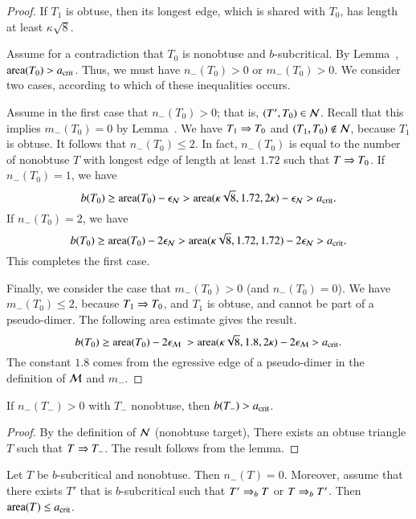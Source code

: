\begin{proof} 
  If $T_1$ is obtuse, then its longest edge, which is shared with
  $T_0$, has length at least $\kappa\sqrt8$.

  Assume for a contradiction that $T_0$ is nonobtuse and
  $b$-subcritical.  By Lemma~, ${\operatorname{area}}(T_0) > a_\text{crit}$.
  Thus, we must have $n_-(T_0)>0$ or $m_-(T_0)>0$.  We consider two
  cases, according to which of these inequalities occurs.

  Assume in the first case that $n_-(T_0)>0$; that is, $(T',T_0)\in
  \mathcal N$.  Recall that this implies $m_-(T_0)=0$ by
  Lemma~.  We have $T_1\Rightarrow T_0$ and $(T_1,T_0)\not\in
  \mathcal N$, because $T_1$ is obtuse.  It follows that $n_-(T_0)\le 2$.  In
  fact, $n_-(T_0)$ is equal to the number of nonobtuse $T$ with
  longest edge of length at least $1.72$ such that $T\Rightarrow T_0$.  If
  $n_-(T_0)=1$, we have
  \[
b(T_0) \ge {\operatorname{area}}(T_0) - \epsilon_{\mathcal N} 
> {\operatorname{area}}(\kappa\sqrt8,1.72,2\kappa)  - \epsilon_{\mathcal N} > a_\text{crit}.
\]
If $n_-(T_0)=2$, we have
  \[
b(T_0) \ge {\operatorname{area}}(T_0) - 2\epsilon_{\mathcal N} 
> {\operatorname{area}}(\kappa\sqrt8,1.72,1.72)  - 2\epsilon_{\mathcal N} > a_\text{crit}.
\]
  This completes the first case.

  Finally, we consider the case that $m_-(T_0)>0$ (and $n_-(T_0)=0$).
  We have $m_-(T_0)\le 2$, because $T_1\Rightarrow T_0$, and $T_1$ is obtuse,
  and cannot be part of a pseudo-dimer.  The following area estimate
  gives the result.
\[
  b(T_0) \ge \area(T_0) - 2\epsM\ 
  > \area(\kappa\sqrt8,1.8,2\kappa) -
  2\epsM > \acrit.
\]
The constant $1.8$ comes from the egressive edge of a pseudo-dimer in
the definition of $\mathcal M$ and $m_-$.
\end{proof}


\begin{corollary} 
  If $n_-(T_-)>0$ with $T_-$ nonobtuse, then $b(T_-) > a_\text{crit}$.
\end{corollary}  

\begin{proof}  
  By the definition of $\mathcal N$ (nonobtuse target), There exists an obtuse
  triangle $T$ such that $T\Rightarrow T_-$.  The result follows from the
  lemma.
\end{proof}

\begin{lemma}  
  Let $T$ be $b$-subcritical and nonobtuse.  Then $n_-(T)=0$.
  Moreover, assume that there exists $T'$ that is $b$-subcritical such
  that $T'\Rightarrow_{b} T$ or $T\Rightarrow_{b} T'$.  Then ${\operatorname{area}}(T)\le a_\text{crit}$.
\end{lemma}

